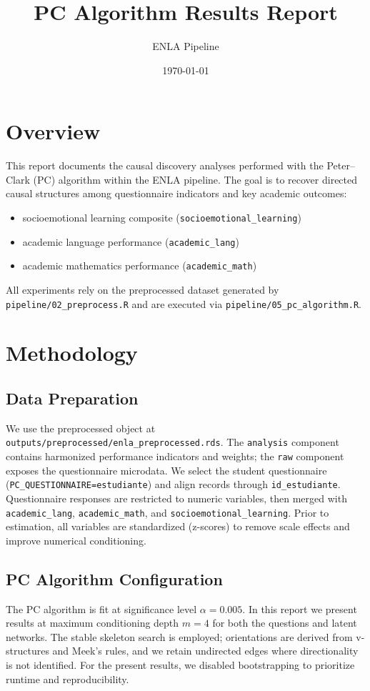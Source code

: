 \documentclass[11pt]{article}
\title{PC Algorithm Results Report}
\author{ENLA Pipeline}
\date{\today}
\begin{document}
\maketitle

\section{Overview}
This report documents the causal discovery analyses performed with the Peter--Clark (PC) algorithm within the ENLA pipeline. The goal is to recover directed causal structures among questionnaire indicators and key academic outcomes:
\begin{itemize}
  \item socioemotional learning composite (\texttt{socioemotional\_learning})
  \item academic language performance (\texttt{academic\_lang})
  \item academic mathematics performance (\texttt{academic\_math})
\end{itemize}
All experiments rely on the preprocessed dataset generated by \texttt{pipeline/02\_preprocess.R} and are executed via \texttt{pipeline/05\_pc\_algorithm.R}.

\section{Methodology}
\subsection{Data Preparation}
We use the preprocessed object at \texttt{outputs/preprocessed/enla\_preprocessed.rds}. The \texttt{analysis} component contains harmonized performance indicators and weights; the \texttt{raw} component exposes the questionnaire microdata. We select the student questionnaire (\texttt{PC\_QUESTIONNAIRE=estudiante}) and align records through \texttt{id\_estudiante}. Questionnaire responses are restricted to numeric variables, then merged with \texttt{academic\_lang}, \texttt{academic\_math}, and \texttt{socioemotional\_learning}. Prior to estimation, all variables are standardized (z-scores) to remove scale effects and improve numerical conditioning.

\subsection{PC Algorithm Configuration}
The PC algorithm is fit at significance level $\alpha=0.005$. In this report we present results at maximum conditioning depth $m=4$ for both the questions and latent networks. The stable skeleton search is employed; orientations are derived from v-structures and Meek's rules, and we retain undirected edges where directionality is not identified. For the present results, we disabled bootstrapping to prioritize runtime and reproducibility.
\end{document}
